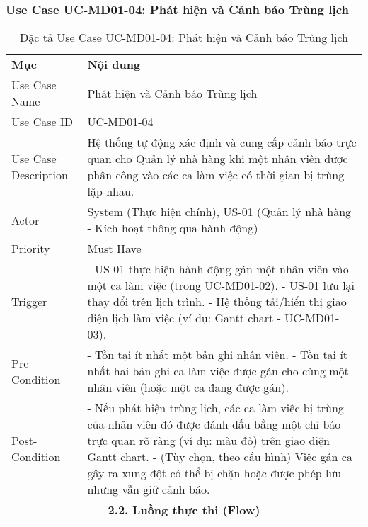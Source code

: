 \subsubsection{Use Case UC-MD01-04: Phát hiện và Cảnh báo Trùng lịch}

\begin{longtable}{|m{4cm}|p{11cm}|}
\caption{Đặc tả Use Case UC-MD01-04: Phát hiện và Cảnh báo Trùng lịch} \label{tab:uc_md01_04} \\
\hline

\endhead %

\hline
\endfoot %

\hline
\endlastfoot %
\multicolumn{2}{|c|}{\textbf{2.1. Tóm tắt (Summary)}} \\
\hline
\textbf{Mục} & \textbf{Nội dung} \\
\hline
Use Case Name & Phát hiện và Cảnh báo Trùng lịch \\
\hline
Use Case ID & UC-MD01-04 \\
\hline
Use Case Description & Hệ thống tự động xác định và cung cấp cảnh báo trực quan cho Quản lý nhà hàng khi một nhân viên được phân công vào các ca làm việc có thời gian bị trùng lặp nhau. \\
\hline
Actor & System (Thực hiện chính), US-01 (Quản lý nhà hàng - Kích hoạt thông qua hành động) \\
\hline
Priority & Must Have \\
\hline
Trigger & - US-01 thực hiện hành động gán một nhân viên vào một ca làm việc (trong UC-MD01-02). \newline - US-01 lưu lại thay đổi trên lịch trình. \newline - Hệ thống tải/hiển thị giao diện lịch làm việc (ví dụ: Gantt chart - UC-MD01-03). \\
\hline
Pre-Condition & - Tồn tại ít nhất một bản ghi nhân viên. \newline - Tồn tại ít nhất hai bản ghi ca làm việc được gán cho cùng một nhân viên (hoặc một ca đang được gán). \\
\hline
Post-Condition & - Nếu phát hiện trùng lịch, các ca làm việc bị trùng của nhân viên đó được đánh dấu bằng một chỉ báo trực quan rõ ràng (ví dụ: màu đỏ) trên giao diện Gantt chart. \newline - (Tùy chọn, theo cấu hình) Việc gán ca gây ra xung đột có thể bị chặn hoặc được phép lưu nhưng vẫn giữ cảnh báo. \\
\hline
\multicolumn{2}{|c|}{\textbf{2.2. Luồng thực thi (Flow)}} \\

\end{longtable}
